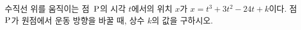 수직선 위를 움직이는 점~$\mathrm{P}$의 시각 $t$에서의 위치 $x$가 $x=t^3+3t^2-24t+k$이다. 점~$\mathrm{P}$가 원점에서 운동 방향을 바꿀 때, 상수 $k$의 값을 구하시오. 
